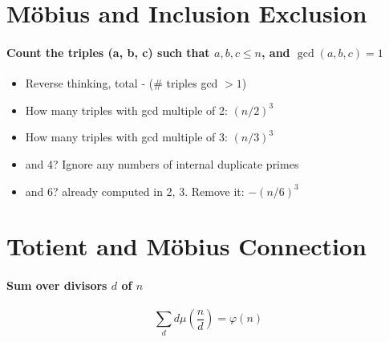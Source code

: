    \section*{Möbius and Inclusion Exclusion}

\paragraph{Count the triples (a, b, c) such that \(a, b, c \leq n\), and
\(\gcd(a, b, c) = 1\)}
\begin{itemize}
    \item Reverse thinking, total - (\# triples gcd \(> 1\))
    \item How many triples with gcd multiple of 2: \((n/2)^3\)
    \item How many triples with gcd multiple of 3: \((n/3)^3\)
    \item and 4? Ignore any numbers of internal duplicate primes
    \item and 6? already computed in 2, 3. Remove it:  \(-(n/6)^3\)
\end{itemize}


\section*{Totient and Möbius Connection}

\paragraph{Sum over divisors \(d\) of \(n\)}
\[
    \sum_d d \mu \left( \frac{n}{d} \right) = \varphi(n)
\]
